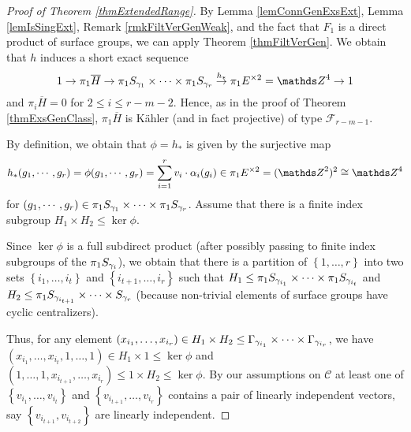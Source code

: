 \begin{proof}[Proof of Theorem \ref{thmExtendedRange}]
By Lemma \ref{lemConnGenExsExt}, Lemma \ref{lemIsSingExt}, Remark \ref{rmkFiltVerGenWeak}, and the fact that $F_1$ is a direct product of surface groups, we can apply Theorem \ref{thmFiltVerGen}. We obtain that $h$ induces a short exact sequence
\[
 1\rightarrow \pi_1 \overline{H} \rightarrow \pi_1 S_{\g_1}\times \dots \times \pi_1 S_{\g_r}\stackrel{h_{\ast}}{\rightarrow} \pi_1 E^{\times 2}=\ZZ^4\rightarrow 1
\]
and $\pi_i \overline{H}=0$ for $2\leq i \leq r-m-2$. Hence, as in the proof of Theorem \ref{thmExsGenClass}, $\pi_1 \overline{H}$ is K\"ahler (and in fact projective) of type $\mathcal{F}_{r-m-1}$.

By definition, we obtain that $\phi=h_{\ast}$ is given by the surjective map
 \[
  h_{\ast}(g_1,\cdots,g_r)=\phi(g_1,\cdots,g_r)=\sum_{i=1}^r v_i\cdot \alpha_i(g_i) 
\in \pi_1 E^{\times 2} = (\ZZ^2)^2\cong \ZZ^4
\]
for $(g_1,\cdots,g_r)\in \pi_1 S_{\gamma_1}\times \cdots \times \pi_1 S_{\gamma_r}$. Assume that there is a finite index subgroup $H_1 \times H_2 \leq \ker \phi$. 

Since $\ker \phi$ is a full subdirect product (after possibly passing to finite index subgroups of the $\pi_1 S_{\gamma_i}$), we obtain that there is a partition of $\left\{1,\dots, r\right\}$ into two sets $\left\{i_1,\dots,i_t\right\}$ and $\left\{ i_{t+1},\dots, i_r\right\}$ such that $H_1 \leq \pi_1 S_{\gamma_{i_1}}\times \dots \times \pi_1 S_{\gamma_{i_t}}$ and $H_2 \leq \pi_1 S_{\gamma_{i_{t+1}}}\times \dots \times S_{\gamma_r}$ (because non-trivial elements of surface groups have cyclic centralizers).

Thus, for any element $(x_{i_1},\dots,x_{i_r})\in H_1\times H_2\leq \Gamma_{\gamma_{i_1}}\times \dots \times \Gamma_{\gamma_{i_r}}$, we have $(x_{i_1},\dots,x_{i_t},1,\dots,1)\in H_1\times 1 \leq \ker \phi$ and $(1,\dots,1,x_{i_{t+1}},\dots,x_{i_r})\leq 1 \times H_2 \leq \ker \phi$. By our assumptions on $\mathcal{C}$ at least one of $\left\{v_{i_1},\dots,v_{i_t}\right\}$ and $\left\{v_{i_{t+1}},\dots,v_{i_r}\right\}$ contains a pair of linearly independent vectors, say $\left\{v_{i_{t+1}},v_{i_{t+2}}\right\}$ are linearly independent.


\end{proof}
